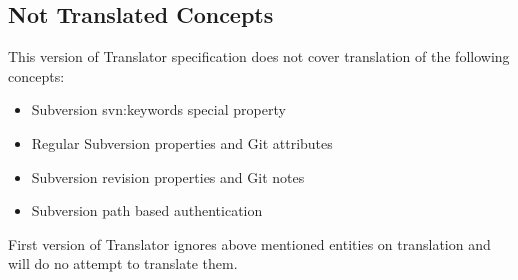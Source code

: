 \subsection{Not Translated Concepts}
This version of Translator specification does not cover translation of the following concepts:
\begin{itemize}
\item Subversion svn:keywords special property
\item Regular Subversion properties and Git attributes
\item Subversion revision properties and Git notes
\item Subversion path based authentication
\end{itemize}

First version of Translator ignores above mentioned entities on translation and will do no attempt to translate them.